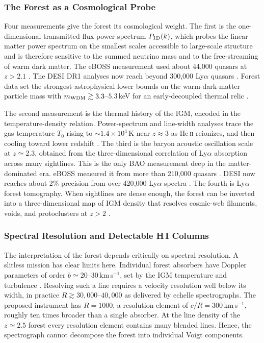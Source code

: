 \documentclass[10pt,onecolumn]{article}
\begin{document}
\subsubsection{The Forest as a Cosmological Probe}

Four measurements give the forest its cosmological weight. The first is the one-dimensional transmitted-flux power spectrum $P_{\rm 1D}(k)$, which probes the linear matter power spectrum on the smallest scales accessible to large-scale structure and is therefore sensitive to the summed neutrino mass and to the free-streaming of warm dark matter. The eBOSS measurement used about 44{,}000 quasars at $z>2.1$ \cite{chabanier2019}. The DESI DR1 analyses now reach beyond 300{,}000 Ly$\alpha$ quasars \cite{karacayli2025,ravoux2025}. Forest data set the strongest astrophysical lower bounds on the warm-dark-matter particle mass with $m_{\rm WDM}\gtrsim3.3$--$5.3$\,keV for an early-decoupled thermal relic \cite{viel2013,irsic2017}.

The second measurement is the thermal history of the IGM, encoded in the temperature-density relation. Power-spectrum and line-width analyses trace the gas temperature $T_0$ rising to $\sim1.4\times10^4$\,K near $z\approx3$ as He\,\textsc{ii} reionizes, and then cooling toward lower redshift \cite{walther2019,gaikwad2021}. The third is the baryon acoustic oscillation scale at $z\simeq2.3$, obtained from the three-dimensional correlation of Ly$\alpha$ absorption across many sightlines. This is the only BAO measurement deep in the matter-dominated era. eBOSS measured it from more than 210{,}000 quasars \cite{dumasdesbourboux2020}. DESI now reaches about 2\% precision from over 420{,}000 Ly$\alpha$ spectra \cite{desi2024lya}. The fourth is Ly$\alpha$ forest tomography. When sightlines are dense enough, the forest can be inverted into a three-dimensional map of IGM density that resolves cosmic-web filaments, voids, and protoclusters at $z>2$ \cite{lee2018clamato,newman2020latis}.

\subsubsection{Spectral Resolution and Detectable H\,I Columns}\label{sec:lyaresolution}

The interpretation of the forest depends critically on spectral resolution. A slitless mission has clear limits here. Individual forest absorbers have Doppler parameters of order $b\simeq20$--$30$\,km\,s$^{-1}$, set by the IGM temperature and turbulence \cite{rudie2012,rudie2013}. Resolving such a line requires a velocity resolution well below its width, in practice $R\gtrsim30{,}000$--$40{,}000$ as delivered by echelle spectrographs. The proposed instrument has $R=1000$, a resolution element of $c/R=300$\,km\,s$^{-1}$, roughly ten times broader than a single absorber. At the line density of the $z\simeq2.5$ forest every resolution element contains many blended lines. Hence, the spectrograph cannot decompose the forest into individual Voigt components.
\end{document}

